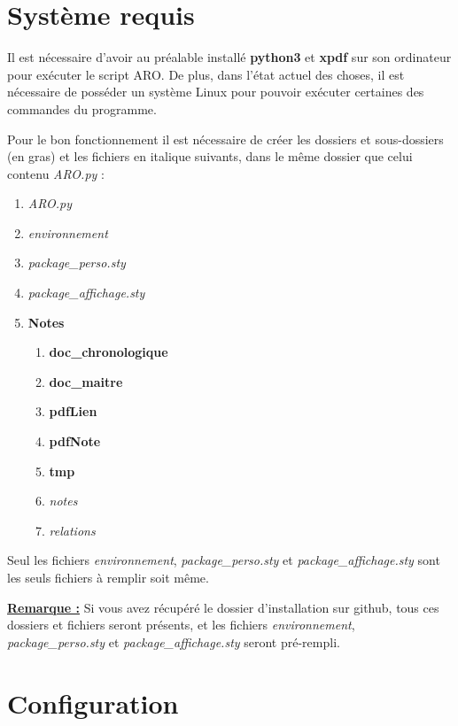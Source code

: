 \documentclass[12pt,a4paper]{article}
\begin{document}
	\section{Système requis}
	
	Il est nécessaire d'avoir au préalable installé \textbf{python3} et \textbf{xpdf} sur son ordinateur pour exécuter le script ARO. De plus, dans l'état actuel des choses, il est nécessaire de posséder un système Linux pour pouvoir exécuter certaines des commandes du programme.
	
	Pour le bon fonctionnement il est nécessaire de créer les dossiers et sous-dossiers (en gras) et les fichiers en italique suivants, dans le même dossier que celui contenu \textit{ARO.py} :
	
	\begin{enumerate}[label=$\star$]
		\item \textit{ARO.py}
		\item \textit{environnement}
		\item \textit{package\_perso.sty}
		\item \textit{package\_affichage.sty}
		\item \textbf{Notes}
		\begin{enumerate}[label=$-$]
			\item \textbf{doc\_chronologique}
			\item \textbf{doc\_maitre}
			\item \textbf{pdfLien}
			\item \textbf{pdfNote}
			\item \textbf{tmp}
			\item \textit{notes}
			\item \textit{relations}
		\end{enumerate}
	\end{enumerate}
	
	Seul les fichiers \textit{environnement}, \textit{package\_perso.sty} et \textit{package\_affichage.sty} sont les seuls fichiers à remplir soit même.
	
	\textbf{\underline{Remarque :}} Si vous avez récupéré le dossier d'installation sur github, tous ces dossiers et fichiers seront présents, et les fichiers \textit{environnement}, \textit{package\_perso.sty} et \textit{package\_affichage.sty} seront pré-rempli.
	
	\section{Configuration}	
	
\end{document}
